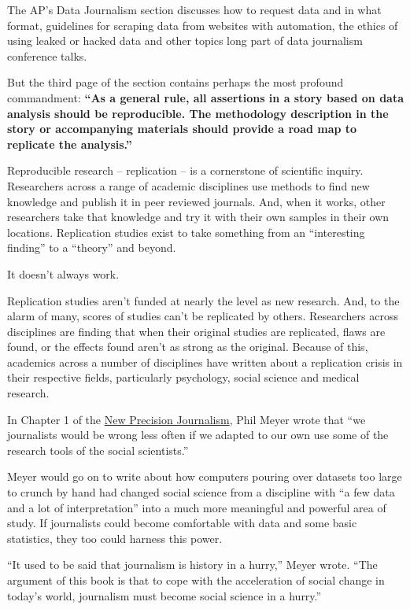 \documentclass[
  letterpaper,
  DIV=11,
  numbers=noendperiod]{scrreprt}
\begin{document}
The AP's Data Journalism section discusses how to request data and in
what format, guidelines for scraping data from websites with automation,
the ethics of using leaked or hacked data and other topics long part of
data journalism conference talks.

But the third page of the section contains perhaps the most profound
commandment: \textbf{``As a general rule, all assertions in a story
based on data analysis should be reproducible. The methodology
description in the story or accompanying materials should provide a road
map to replicate the analysis.''}

Reproducible research -- replication -- is a cornerstone of scientific
inquiry. Researchers across a range of academic disciplines use methods
to find new knowledge and publish it in peer reviewed journals. And,
when it works, other researchers take that knowledge and try it with
their own samples in their own locations. Replication studies exist to
take something from an ``interesting finding'' to a ``theory'' and
beyond.

It doesn't always work.

Replication studies aren't funded at nearly the level as new research.
And, to the alarm of many, scores of studies can't be replicated by
others. Researchers across disciplines are finding that when their
original studies are replicated, flaws are found, or the effects found
aren't as strong as the original. Because of this, academics across a
number of disciplines have written about a replication crisis in their
respective fields, particularly psychology, social science and medical
research.

In Chapter 1 of the
\href{https://www.amazon.com/New-Precision-Journalism-Midland-Book/dp/0253206642}{New
Precision Journalism}, Phil Meyer wrote that ``we journalists would be
wrong less often if we adapted to our own use some of the research tools
of the social scientists.''

Meyer would go on to write about how computers pouring over datasets too
large to crunch by hand had changed social science from a discipline
with ``a few data and a lot of interpretation'' into a much more
meaningful and powerful area of study. If journalists could become
comfortable with data and some basic statistics, they too could harness
this power.

``It used to be said that journalism is history in a hurry,'' Meyer
wrote. ``The argument of this book is that to cope with the acceleration
of social change in today's world, journalism must become social science
in a hurry.''
\end{document}
